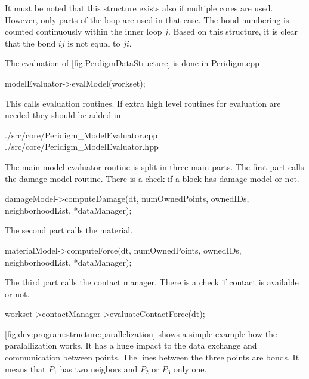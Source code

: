 It must be noted that this structure exists also if multiple cores are used. However, only parts of the loop are used in that case. The bond numbering is counted continuously within the inner loop $j$. Based on this structure, it is clear that the bond $ij$ is not equal to $ji$.


The evaluation of \autoref{fig:PerdigmDataStructure} is done in Peridigm.cpp

\begingroup
\lstset{breaklines=true}
\begin{code}
modelEvaluator->evalModel(workset);
\end{code}
\endgroup
This calls evaluation routines. If extra high level routines for evaluation are needed they should be added in

\begingroup
\lstset{breaklines=true}
\begin{code}
./src/core/Peridigm_ModelEvaluator.cpp
./src/core/Peridigm_ModelEvaluator.hpp
\end{code}
\endgroup

The main model evaluator routine is split in three main parts.
The first part calls the damage model routine. There is a check if a block has damage model or not.

\begingroup
\lstset{breaklines=true}
\begin{code}
damageModel->computeDamage(dt, 
                           numOwnedPoints,
                           ownedIDs,
                           neighborhoodList,
                           *dataManager);
\end{code}
\endgroup
The second part calls the material.
\begingroup
\lstset{breaklines=true}
\begin{code}
    materialModel->computeForce(dt, 
                                numOwnedPoints,
                                ownedIDs,
                                neighborhoodList,
                                *dataManager);
\end{code}
\endgroup

The third part calls the contact manager. There is a check if contact is available or not.
\begingroup
\lstset{breaklines=true}
\begin{code}
    workset->contactManager->evaluateContactForce(dt);
\end{code}
\endgroup


\autoref{fig:dev:program:structure:parallelization} shows a simple example how the paralallization works. It has a huge impact to the data exchange and communication between points. The lines between the three points are bonds. It means that $P_1$ has two neigbors and $P_2$ or $P_3$ only one.

